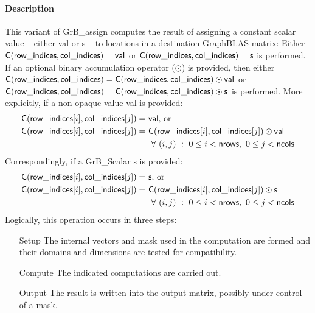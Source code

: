\paragraph{Description}

{\color{red}
This variant of {\sf GrB\_assign} computes the result of assigning a constant
scalar value -- either {\sf val} or {\sf s} -- to locations in a destination GraphBLAS matrix: 
Either
${\sf C}({\sf row\_indices, col\_indices}) = {\sf val}$ or ${\sf C}({\sf row\_indices, col\_indices}) = {\sf s}$ is performed.
If an optional binary accumulation operator ($\odot$) is provided, then either
${\sf C}({\sf row\_indices, col\_indices}) = {\sf C}({\sf row\_indices, col\_indices}) \odot {\sf val}$ or
${\sf C}({\sf row\_indices, col\_indices}) = {\sf C}({\sf row\_indices, col\_indices}) \odot {\sf s}$ is performed.
More explicitly, if a non-opaque value {\sf val} is provided:
\[
\begin{aligned}
	{\sf C}({\sf row\_indices}[i],{\sf col\_indices}[j]) =\ & {\sf val} \mbox{,~or~} \\
    {\sf C}({\sf row\_indices}[i],{\sf col\_indices}[j]) =\ & 
    {\sf C}({\sf row\_indices}[i],{\sf col\_indices}[j]) \odot {\sf val} \\
    & \ \forall \ (i,j) \ : \ 0 \leq i < {\sf nrows},\ 0 \leq j < {\sf ncols}
\end{aligned}
\]  
Correspondingly, if a {\sf GrB\_Scalar} {\sf s} is provided:
\[
\begin{aligned}
	{\sf C}({\sf row\_indices}[i],{\sf col\_indices}[j]) =\ & {\sf s} \mbox{,~or~} \\
    {\sf C}({\sf row\_indices}[i],{\sf col\_indices}[j]) =\ & 
    {\sf C}({\sf row\_indices}[i],{\sf col\_indices}[j]) \odot {\sf s} \\
    & \ \forall \ (i,j) \ : \ 0 \leq i < {\sf nrows},\ 0 \leq j < {\sf ncols}
\end{aligned}
\]
}
Logically, this operation occurs in three steps:
\begin{enumerate}[leftmargin=0.85in]
\item[Setup] The internal vectors and mask used in the computation are formed 
and their domains and dimensions are tested for compatibility.
\item[Compute] The indicated computations are carried out.
\item[Output] The result is written into the output matrix, possibly under 
control of a mask.
\end{enumerate}

